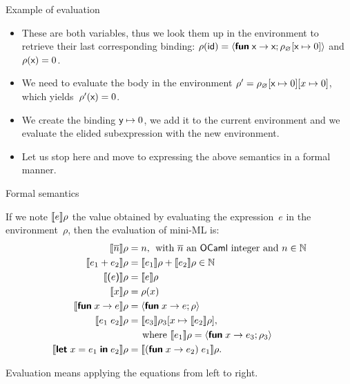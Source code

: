 %
\begin{frame}{Example of evaluation}

  \begin{itemize}

    \item These are both variables, thus we look them up in the
      environment to retrieve their last corresponding binding:
      \(\rho(\textsf{id}) = \langle \textsf{\textbf{fun}} \; \textsf{x} \rightarrow \textsf{x}; \rho_\varnothing[\textsf{x} \mapsto 0] \rangle\) and
            \(\rho(\textsf{x}) = 0\).

    \item We need to evaluate the body in the environment $\rho' =
      \rho_\varnothing[\textsf{x} \mapsto 0][x \mapsto 0]$, which
      yields~\(\rho'(\textsf{x}) = 0\).

    \item We create the binding $\textsf{y} \mapsto 0$, we add it to
      the current environment and we evaluate the elided subexpression
      with the new environment.

    \item Let us stop here and move to expressing the above semantics
      in a formal manner.

  \end{itemize}

\end{frame}

%
\begin{frame}{Formal semantics}

  If we note \(\llbracket{e}\rrbracket{\rho}\) the value obtained by evaluating the
  expression~\(e\) in the environment~\(\rho\), then the evaluation of
  mini-ML is:
  \begin{align*}
    \evalf{\overline{n}}{\rho} &= n, \;\, \text{with
      $\overline{n}$ an \OCaml integer and $n \in \mathbb{N}$}\\
    \evalf{e_1 + e_2}{\rho} &=
    \evalf{e_1}{\rho} + \evalf{e_2}{\rho} \in \mathbb{N}\\
    \evalf{\lpar{e}\rpar}{\rho} &= \evalf{e}{\rho}\\
    \evalf{x}{\rho} &= \rho(x)\\
    \evalf{\Xfun \; x \rightarrow e}{\rho} &= \clos{x}{e}{\rho}\\
    \evalf{e_1 \; e_2}{\rho}
    &= \evalf{e_3}{\extend{\rho_3}{x}{\evalf{e_2}{\rho}}},\\
    &\phantom{=\llbracket} \textnormal{where} \ \evalf{e_1}{\rho} =
    \clos{x}{e_3}{\rho_3}\\
    \evalf{\Xlet \; x = e_1 \; \Xin \; e_2}{\rho}
    &= \evalf{(\Xfun \; x \rightarrow e_2) \; e_1}{\rho}.
  \end{align*}

  Evaluation means applying the equations from left to right.

\end{frame}

